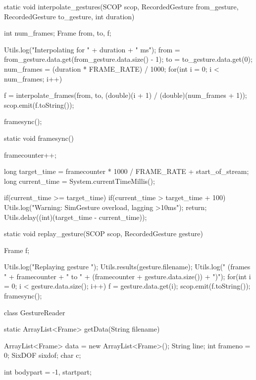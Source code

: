 \documentclass[12pt,a4,notitlepage]{report}
\renewcommand{\_}{\texttt{\symbol{95}}}
\newcommand{\<}{\texttt{\symbol{60}}}
\renewcommand{\>}{\texttt{\symbol{62}}}
\begin{document}
\begin{code}
{   static void interpolate_gestures(SCOP scop, RecordedGesture from_gesture,
         RecordedGesture to_gesture, int duration)
   {
      int num_frames;
      Frame from, to, f;
      
      Utils.log("Interpolating for " + duration + " ms");
      from = from_gesture.data.get(from_gesture.data.size() - 1);
      to = to_gesture.data.get(0);
      num_frames = (duration * FRAME_RATE) / 1000;
      for(int i = 0; i < num_frames; i++)
      {
         f = interpolate_frames(from, to,
               (double)(i + 1) / (double)(num_frames + 1));
         scop.emit(f.toString());
                  
         framesync();
      }
   }

   static void framesync()
   {
      framecounter++;
      
      long target_time = framecounter * 1000 / FRAME_RATE + start_of_stream;
      long current_time = System.currentTimeMillis();
      
      if(current_time >= target_time)
      {
         if(current_time > target_time + 100)
            Utils.log("Warning: SimGesture overload, lagging >10ms");
         return;
      }
      Utils.delay((int)(target_time - current_time));
   }
         
   static void replay_gesture(SCOP scop, RecordedGesture gesture)
   {
      Frame f;
      
      Utils.log("Replaying gesture ");
      Utils.results(gesture.filename);
      Utils.log(" (frames " + framecounter + " to " + (framecounter +
            gesture.data.size()) + ")");
      for(int i = 0; i < gesture.data.size(); i++)
      {
         f = gesture.data.get(i);
         scop.emit(f.toString());
         framesync();
      }

   }
}

class GestureReader
{
   static ArrayList<Frame> getData(String filename)
   {
      ArrayList<Frame> data = new ArrayList<Frame>();
      String line;
      int frameno = 0;
      SixDOF sixdof;
      char c;
      
      int bodypart = -1, startpart;
      
}}
\end{code}
\end{document}
